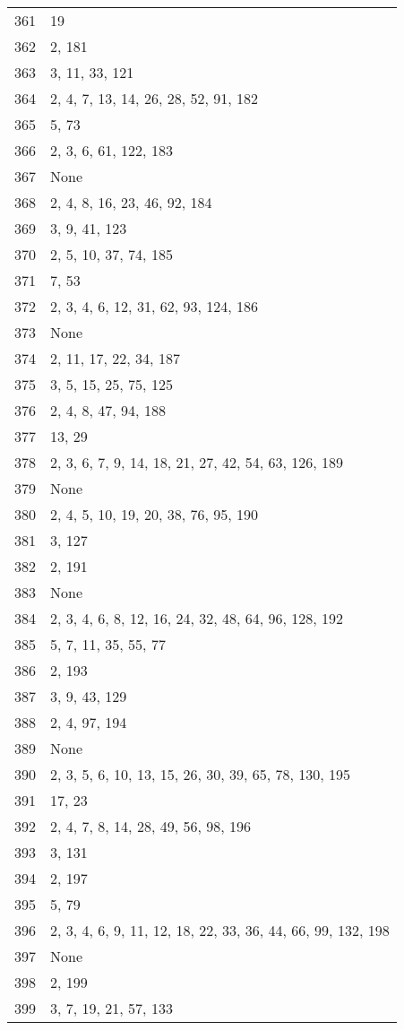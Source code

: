 \documentclass[12pt]{article}
\begin{document}
\begin{tabular}{|r|l|}
361 & 19 \\ 
362 & 2, 181 \\ 
363 & 3, 11, 33, 121 \\ 
364 & 2, 4, 7, 13, 14, 26, 28, 52, 91,  182 \\ 
365 & 5, 73 \\ 
366 & 2, 3, 6, 61, 122, 183 \\ 
367 & None \\ 
368 & 2, 4, 8, 16, 23, 46, 92, 184 \\ 
369 & 3, 9,  41, 123 \\ 
370 & 2, 5, 10, 37, 74, 185 \\ 
371 & 7, 53 \\ 
372 & 2, 3, 4, 6, 12, 31, 62, 93, 124, 186 \\ 
373 & None \\ 
374 & 2, 11, 17, 22, 34, 187 \\ 
375 & 3, 5, 15, 25, 75, 125 \\ 
376 & 2, 4, 8, 47, 94, 188 \\ 
377 & 13, 29 \\ 
378 & 2,  3, 6, 7, 9, 14, 18, 21, 27, 42, 54, 63, 126, 189 \\ 
379 & None \\ 
380 & 2, 4, 5, 10, 19, 20, 38, 76, 95, 190 \\ 
381 & 3, 127 \\ 
382 & 2, 191 \\ 
383 & None \\ 
384 & 2, 3, 4, 6, 8, 12, 16, 24, 32, 48, 64, 96, 128, 192 \\ 
385 & 5, 7, 11, 35,  55, 77 \\ 
386 & 2, 193 \\ 
387 & 3, 9, 43, 129 \\ 
388 & 2, 4, 97, 194 \\ 
389 & None \\ 
390 & 2, 3, 5, 6, 10, 13, 15, 26, 30, 39, 65, 78, 130, 195 \\ 
391 & 17, 23 \\ 
392 & 2, 4, 7, 8, 14, 28, 49, 56, 98, 196 \\ 
393 & 3, 131 \\ 
394 & 2, 197 \\ 
395 & 5, 79 \\ 
396 & 2, 3, 4, 6, 9, 11, 12, 18, 22, 33, 36, 44, 66, 99, 132, 198 \\ 
397 & None \\ 
398 & 2, 199 \\ 
399 & 3, 7, 19, 21, 57, 133 \\ 

\end{tabular}
\end{document}

